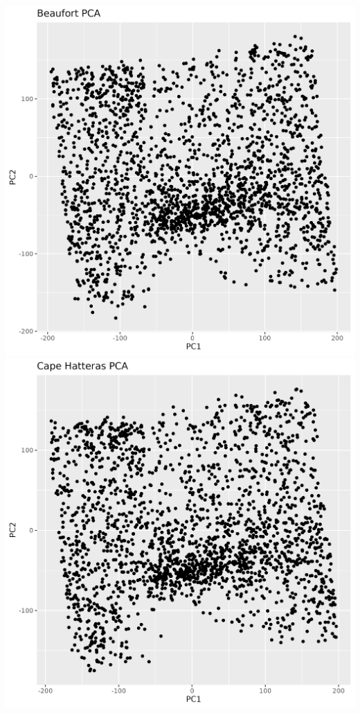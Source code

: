 \documentclass[
]{article}
\begin{document}
\includegraphics{figures/beaufpca.png}
\includegraphics{figures/chpca.png}
\end{document}
